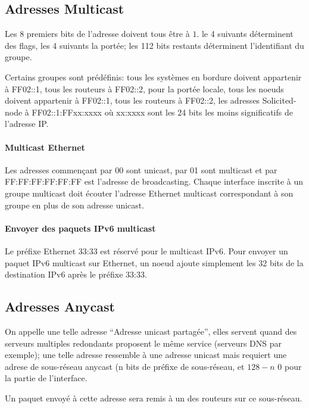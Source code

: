 \documentclass{report}
\begin{document}
\subsection{Adresses Multicast}

Les 8 premiers bits de l'adresse doivent tous être à $1$. le 4
suivants déterminent des flags, les 4 suivants la portée; les 112 bits
restants déterminent l'identifiant du groupe.

Certains groupes sont prédéfinis: tous les systèmes en bordure doivent
appartenir à FF02::1, tous les routeurs à FF02::2, pour la portée
locale, tous les noeuds doivent appartenir à FF02::1, tous les
routeurs à FF02::2, les adresses Solicited-node à FF02::1:FFxx:xxxx où
xx:xxxx sont les 24 bits les moins significatifs de l'adresse IP.

\paragraph{Multicast Ethernet}

Les adresses commençant par 00 sont unicast, par 01 sont multicast et
par FF:FF:FF:FF:FF:FF est l'adresse de broadcasting. Chaque interface
inscrite à un groupe multicast doit écouter l'adresse Ethernet
multicast correspondant à son groupe en plus de son adresse unicast.

\paragraph{Envoyer des paquets IPv6 multicast}

Le préfixe Ethernet 33:33 est réservé pour le multicast IPv6. Pour
envoyer un paquet IPv6 multicast sur Ethernet, un noeud ajoute
simplement les 32 bits de la destination IPv6 après le préfixe 33:33.

\subsection{Adresses Anycast}

On appelle une telle adresse ``Adresse unicast partagée'', elles
servent quand des serveurs multiples redondants proposent le même
service (serveurs DNS par exemple); une telle adresse ressemble à une
adresse unicast mais requiert une adrese de sous-réseau anycast (n
bits de préfixe de sous-réseau, et $128-n$ 0 pour la partie de
l'interface.

Un paquet envoyé à cette adresse sera remis à un des routeurs sur ce
sous-réseau.
\end{document}
